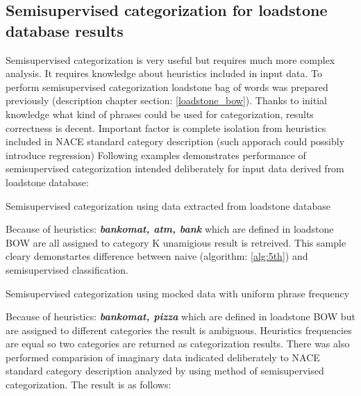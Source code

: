 \subsection{Semisupervised categorization for loadstone database results}
Semisupervised categorization is very useful but requires much more complex analysis. It requires knowledge about heuristics included in input data. To perform semisupervised categorization loadstone bag of words was prepared previously (description chapter section: \ref{loadstone_bow}). Thanks to initial knowledge what kind of phrases could be used for categorization, results correctness is decent. Important factor is complete isolation from heuristics included in NACE standard category description (such apporach could possibly introduce regression) Following examples demonstrates performance of semisupervised categorization intended deliberately for input data derived from loadstone database:
\newline
\begin{algorithm}[h]
	\hfill \break
	\caption{Semisupervised categorization using data extracted from loadstone database}\label{alg:6th}
\end{algorithm}
\newline
Because of heuristics: \textbf{\textit{bankomat, atm, bank}} which are defined in loadstone BOW are all assigned to category K unamigious result is retreived. This sample cleary demonstartes difference between naive (algorithm: \ref{alg:5th}) and semisupervised classification.
\newline
\begin{algorithm}[h]
	\hfill \break
	\caption{Semisupervised categorization using mocked data with uniform phrase frequency}\label{alg:7th}
\end{algorithm}
\newline
Because of heuristics: \textbf{\textit{bankomat, pizza}} which are defined in loadstone BOW but are assigned to different categories the result is ambiguous. Heuristics frequencies are equal so two categories are returned as categorization results.
\newline
There was also performed comparision of imaginary data indicated deliberately to NACE standard category description analyzed by using method of semisupervised categorization. The result is as follows:
